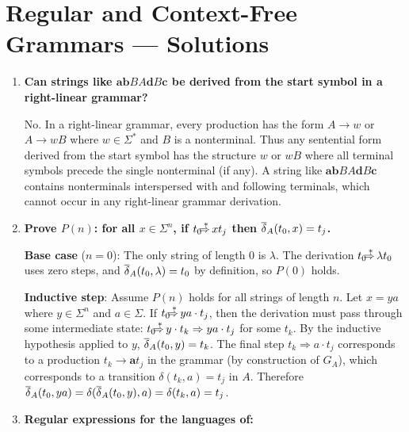 
\chapter{Regular and Context-Free Grammars --- Solutions}

\begin{enumerate}[{8.}1. ]

\item \textbf{Can strings like $\pmb{ab}BA\pmb{d}B\pmb{c}$ be derived from the start symbol in a right-linear grammar?}

No. In a right-linear grammar, every production has the form $A \to w$ or $A \to wB$ where $w \in \Sigma^*$ and $B$ is a nonterminal. Thus any sentential form derived from the start symbol has the structure $w$ or $wB$ where all terminal symbols precede the single nonterminal (if any). A string like $\pmb{ab}BA\pmb{d}B\pmb{c}$ contains nonterminals interspersed with and following terminals, which cannot occur in any right-linear grammar derivation.

\item \textbf{Prove $P(n)$: for all $x \in \Sigma^n$, if $t_0 \DRightarrow xt_j$ then $\overline{\delta}_A(t_0, x) = t_j$.}

\textbf{Base case} ($n=0$): The only string of length 0 is $\lambda$. The derivation $t_0 \DRightarrow \lambda t_0$ uses zero steps, and $\overline{\delta}_A(t_0, \lambda) = t_0$ by definition, so $P(0)$ holds.

\textbf{Inductive step}: Assume $P(n)$ holds for all strings of length $n$. Let $x = ya$ where $y \in \Sigma^n$ and $a \in \Sigma$. If $t_0 \DRightarrow ya \cdot t_j$, then the derivation must pass through some intermediate state: $t_0 \DRightarrow y \cdot t_k \Rightarrow ya \cdot t_j$ for some $t_k$. By the inductive hypothesis applied to $y$, $\overline{\delta}_A(t_0, y) = t_k$. The final step $t_k \Rightarrow a \cdot t_j$ corresponds to a production $t_k \to \pmb{a} t_j$ in the grammar (by construction of $G_A$), which corresponds to a transition $\delta(t_k, a) = t_j$ in $A$. Therefore $\overline{\delta}_A(t_0, ya) = \delta(\overline{\delta}_A(t_0, y), a) = \delta(t_k, a) = t_j$.

\item \textbf{Regular expressions for the languages of:}


\end{enumerate}
